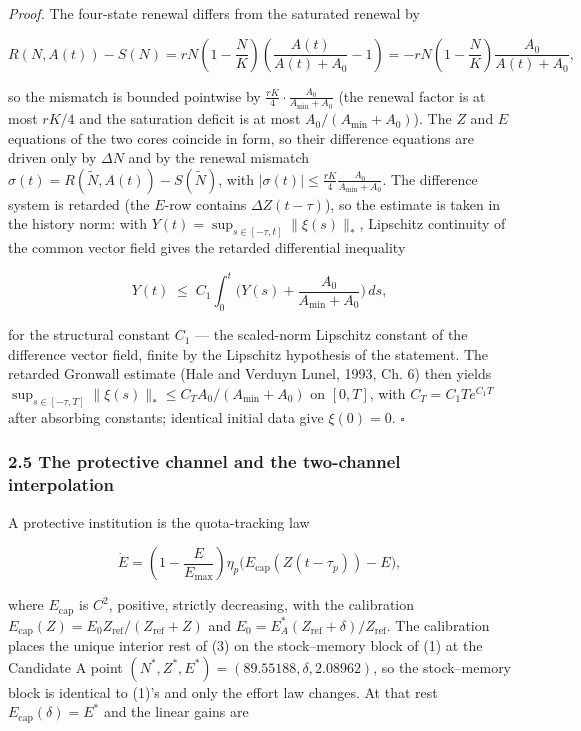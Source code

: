 \documentclass[11pt]{article}
\begin{document}
\emph{Proof.} The four-state renewal differs from the saturated renewal
by

\[R(N, A(t)) - S(N) = rN\left(1 - \frac{N}{K}\right)\left( \frac{A(t)}{A(t) + A_0} - 1 \right) = -rN\left(1 - \frac{N}{K}\right)\frac{A_0}{A(t) + A_0},\]

so the mismatch is bounded pointwise by
\(\frac{rK}{4} \cdot \frac{A_0}{A_{\min} + A_0}\) (the renewal factor is
at most \(rK/4\) and the saturation deficit is at most
\(A_0/(A_{\min} + A_0)\)). The \(Z\) and \(E\) equations of the two
cores coincide in form, so their difference equations are driven only by
\(\Delta N\) and by the renewal mismatch
\(\sigma(t) = R(\tilde N, A(t)) - S(\tilde N)\), with
\(|\sigma(t)| \le \frac{rK}{4} \frac{A_0}{A_{\min} + A_0}\). The
difference system is retarded (the \(E\)-row contains
\(\Delta Z(t - \tau)\)), so the estimate is taken in the history norm:
with \(Y(t) = \sup_{s \in [-\tau, t]} \|\xi(s)\|_*\), Lipschitz
continuity of the common vector field gives the retarded differential
inequality

\[Y(t) \;\le\; C_1 \int_0^t \Big( Y(s) + \frac{A_0}{A_{\min} + A_0} \Big)\, ds,\]

for the structural constant \(C_1\) --- the scaled-norm Lipschitz
constant of the difference vector field, finite by the Lipschitz
hypothesis of the statement. The retarded Gronwall estimate (Hale and
Verduyn Lunel, 1993, Ch. 6) then yields
\(\sup_{s \in [-\tau, T]} \|\xi(s)\|_* \le C_T A_0/(A_{\min} + A_0)\) on
\([0,T]\), with \(C_T = C_1 T e^{C_1 T}\) after absorbing constants;
identical initial data give \(\xi(0) = 0\). \ensuremath{\square}

\subsubsection{2.5 The protective channel and the two-channel
interpolation}\label{the-protective-channel-and-the-two-channel-interpolation}

A protective institution is the quota-tracking law

\[\dot E = \left(1 - \frac{E}{E_{\max}}\right) \eta_p \bigl( E_{\mathrm{cap}}(Z(t - \tau_p)) - E \bigr), \tag{3}\]

where \(E_{\mathrm{cap}}\) is \(C^2\), positive, strictly decreasing,
with the calibration
\(E_{\mathrm{cap}}(Z) = E_0 Z_{\mathrm{ref}}/(Z_{\mathrm{ref}} + Z)\)
and \(E_0 = E^*_A(Z_{\mathrm{ref}} + \delta)/Z_{\mathrm{ref}}\). The
calibration places the unique interior rest of (3) on the stock--memory
block of (1) at the Candidate A point
\((N^*, Z^*, E^*) = (89.55188, \delta, 2.08962)\), so the stock--memory
block is identical to (1)'s and only the effort law changes. At that
rest \(E_{\mathrm{cap}}(\delta) = E^*\) and the linear gains are
\end{document}
